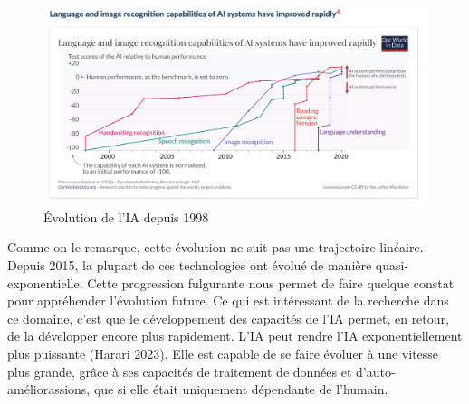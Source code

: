 \documentclass[
  letterpaper,
]{scrbook}
\begin{document}
\begin{figure}

{\centering \includegraphics{images/chapitre9_figure1.png}

}

\caption{Évolution de l'IA depuis 1998}

\end{figure}

\newpage{}

Comme on le remarque, cette évolution ne suit pas une trajectoire
linéaire. Depuis 2015, la plupart de ces technologies ont évolué de
manière quasi-exponentielle. Cette progression fulgurante nous permet de
faire quelque constat pour appréhender l'évolution future. Ce qui est
intéressant de la recherche dans ce domaine, c'est que le développement
des capacités de l'IA permet, en retour, de la développer encore plus
rapidement. L'IA peut rendre l'IA exponentiellement plus puissante
(Harari 2023). Elle est capable de se faire évoluer à une vitesse plus
grande, grâce à ses capacités de traitement de données et
d'auto-améliorassions, que si elle était uniquement dépendante de
l'humain.
\end{document}
